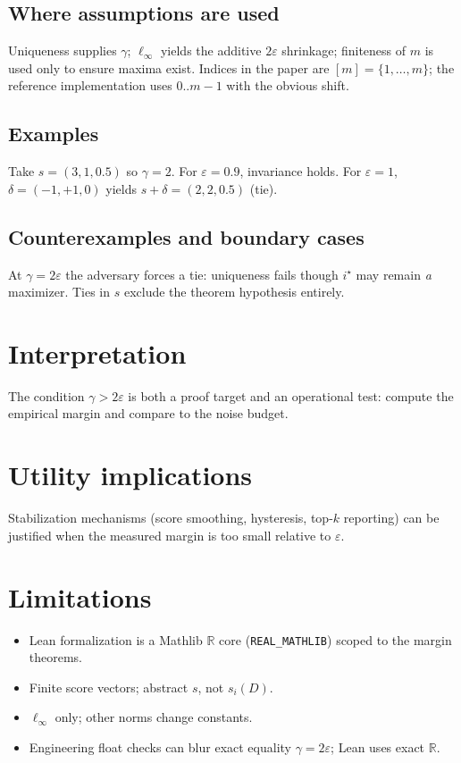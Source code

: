 \documentclass[11pt]{article}
\begin{document}
\subsection{Where assumptions are used}
Uniqueness supplies \(\gamma\); \(\ell_\infty\) yields the additive \(2\varepsilon\)
shrinkage; finiteness of \(m\) is used only to ensure maxima exist.
Indices in the paper are \([m]=\{1,\dots,m\}\); the reference implementation
uses \(0..m-1\) with the obvious shift.

\subsection{Examples}
Take \(s=(3,1,0.5)\) so \(\gamma=2\). For \(\varepsilon=0.9\), invariance holds.
For \(\varepsilon=1\), \(\delta=(-1,+1,0)\) yields \(s+\delta=(2,2,0.5)\) (tie).

\subsection{Counterexamples and boundary cases}
At \(\gamma=2\varepsilon\) the adversary forces a tie: uniqueness fails though
\(i^\star\) may remain \emph{a} maximizer.
Ties in \(s\) exclude the theorem hypothesis entirely.

\section{Interpretation}
The condition \(\gamma>2\varepsilon\) is both a proof target and an operational
test: compute the empirical margin and compare to the noise budget.

\section{Utility implications}
Stabilization mechanisms (score smoothing, hysteresis, top-\(k\) reporting) can
be justified when the measured margin is too small relative to \(\varepsilon\).

\section{Limitations}
\begin{itemize}
\item Lean formalization is a Mathlib \(\mathbb{R}\) core
  (\texttt{REAL\_MATHLIB}) scoped to the margin theorems.
\item Finite score vectors; abstract \(s\), not \(s_i(D)\).
\item \(\ell_\infty\) only; other norms change constants.
\item Engineering float checks can blur exact equality \(\gamma=2\varepsilon\); Lean uses exact \(\mathbb{R}\).
\end{itemize}
\end{document}
